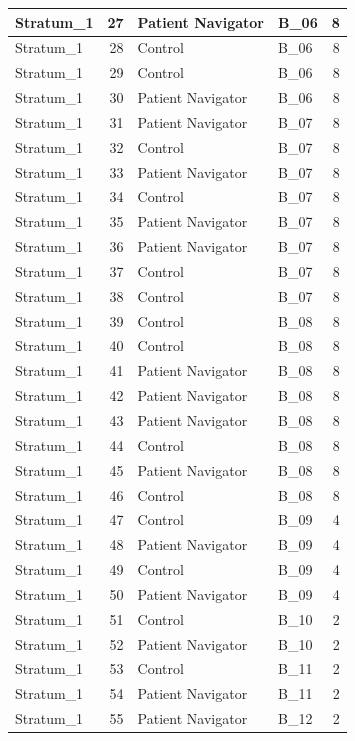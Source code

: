 \documentclass[
]{book}
\begin{document}
\begin{table}[H]
\begin{tabular}{l|r|l|l|r}
\hline
Stratum\_1 & 27 & Patient Navigator & B\_06 & 8\\
\hline
Stratum\_1 & 28 & Control & B\_06 & 8\\
\hline
Stratum\_1 & 29 & Control & B\_06 & 8\\
\hline
Stratum\_1 & 30 & Patient Navigator & B\_06 & 8\\
\hline
Stratum\_1 & 31 & Patient Navigator & B\_07 & 8\\
\hline
Stratum\_1 & 32 & Control & B\_07 & 8\\
\hline
Stratum\_1 & 33 & Patient Navigator & B\_07 & 8\\
\hline
Stratum\_1 & 34 & Control & B\_07 & 8\\
\hline
Stratum\_1 & 35 & Patient Navigator & B\_07 & 8\\
\hline
Stratum\_1 & 36 & Patient Navigator & B\_07 & 8\\
\hline
Stratum\_1 & 37 & Control & B\_07 & 8\\
\hline
Stratum\_1 & 38 & Control & B\_07 & 8\\
\hline
Stratum\_1 & 39 & Control & B\_08 & 8\\
\hline
Stratum\_1 & 40 & Control & B\_08 & 8\\
\hline
Stratum\_1 & 41 & Patient Navigator & B\_08 & 8\\
\hline
Stratum\_1 & 42 & Patient Navigator & B\_08 & 8\\
\hline
Stratum\_1 & 43 & Patient Navigator & B\_08 & 8\\
\hline
Stratum\_1 & 44 & Control & B\_08 & 8\\
\hline
Stratum\_1 & 45 & Patient Navigator & B\_08 & 8\\
\hline
Stratum\_1 & 46 & Control & B\_08 & 8\\
\hline
Stratum\_1 & 47 & Control & B\_09 & 4\\
\hline
Stratum\_1 & 48 & Patient Navigator & B\_09 & 4\\
\hline
Stratum\_1 & 49 & Control & B\_09 & 4\\
\hline
Stratum\_1 & 50 & Patient Navigator & B\_09 & 4\\
\hline
Stratum\_1 & 51 & Control & B\_10 & 2\\
\hline
Stratum\_1 & 52 & Patient Navigator & B\_10 & 2\\
\hline
Stratum\_1 & 53 & Control & B\_11 & 2\\
\hline
Stratum\_1 & 54 & Patient Navigator & B\_11 & 2\\
\hline
Stratum\_1 & 55 & Patient Navigator & B\_12 & 2\\

\end{tabular}
\end{table}
\end{document}
